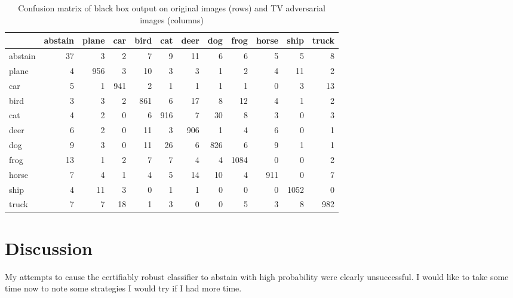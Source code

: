 \documentclass{article}
\begin{document}
\begin{table}[H]
    \begin{tabular}{lrrrrrrrrrrr}
    \toprule
    {} &  abstain &  plane &  car &  bird &  cat &  deer &  dog &  frog &  horse &  ship &  truck \\
    \midrule
    abstain &       37 &      3 &    2 &     7 &    9 &    11 &    6 &     6 &      5 &     5 &      8 \\
    plane   &        4 &    956 &    3 &    10 &    3 &     3 &    1 &     2 &      4 &    11 &      2 \\
    car     &        5 &      1 &  941 &     2 &    1 &     1 &    1 &     1 &      0 &     3 &     13 \\
    bird    &        3 &      3 &    2 &   861 &    6 &    17 &    8 &    12 &      4 &     1 &      2 \\
    cat     &        4 &      2 &    0 &     6 &  916 &     7 &   30 &     8 &      3 &     0 &      3 \\
    deer    &        6 &      2 &    0 &    11 &    3 &   906 &    1 &     4 &      6 &     0 &      1 \\
    dog     &        9 &      3 &    0 &    11 &   26 &     6 &  826 &     6 &      9 &     1 &      1 \\
    frog    &       13 &      1 &    2 &     7 &    7 &     4 &    4 &  1084 &      0 &     0 &      2 \\
    horse   &        7 &      4 &    1 &     4 &    5 &    14 &   10 &     4 &    911 &     0 &      7 \\
    ship    &        4 &     11 &    3 &     0 &    1 &     1 &    0 &     0 &      0 &  1052 &      0 \\
    truck   &        7 &      7 &   18 &     1 &    3 &     0 &    0 &     5 &      3 &     8 &    982 \\
    \bottomrule
    \end{tabular}


    \caption{Confusion matrix of black box output on original images (rows) and TV adversarial images (columns)}
\end{table}

\section{Discussion}
My attempts to cause the certifiably robust classifier to abstain with high probability were clearly unsuccessful. I would like to take some time now to note some strategies I would try if I had more time.
\end{document}
